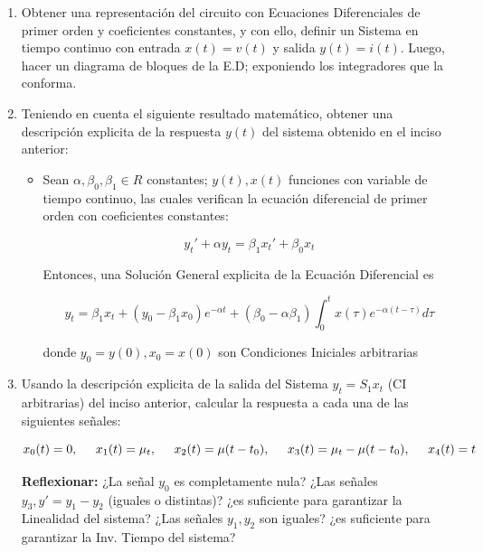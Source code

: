 \documentclass[12pt,a4paper]{report}
\begin{document}
  \begin{enumerate}[label=\alph*)]
    \item Obtener una representación del circuito con Ecuaciones Diferenciales de primer orden
      y coeficientes constantes, y con ello, definir un Sistema en tiempo continuo con entrada
      $x(t) = v(t)$ y salida $y(t) = i(t)$. Luego, hacer un diagrama de bloques de la E.D; exponiendo
      los integradores que la conforma.

    \item Teniendo en cuenta el siguiente resultado matemático, obtener una descripción explicita
      de la respuesta $y(t)$ del sistema obtenido en el inciso anterior:
      \begin{itemize}
        \item Sean $\alpha, \beta_0, \beta_1 \in R$ constantes; $y(t), x(t)$ funciones con variable de tiempo continuo,
          las cuales verifican la ecuación diferencial de primer orden con coeficientes constantes:

          $$y_t'+\alpha y_t = \beta_1 x_t' + \beta_0 x_t$$

          Entonces, una Solución General explicita de la Ecuación Diferencial es

          $$y_t = \beta_1 x_t + (y_0 - \beta_1 x_0) e^{-\alpha t} + (\beta_0 - \alpha \beta_1) \int_{0}^{t} x(\tau) e^{-\alpha(t - \tau)} d\tau$$

          donde $y_0 = y(0), x_0 = x(0)$ son Condiciones Iniciales arbitrarias
        \end{itemize}

    \item Usando la descripción explicita de la salida del Sistema $y_t = S_1{x_t}$ (CI arbitrarias) del
      inciso anterior, calcular la respuesta a cada una de las siguientes señales:

      $$x_0(t) = 0, \hspace{0.5cm}x_1(t) = \mu_t, \hspace{0.5cm}x_2(t) = \mu(t - t_0), \hspace{0.5cm}x_3(t) = \mu_t - \mu(t - t_0), \hspace{0.5cm}x_4(t) = t$$

      \textbf{Reflexionar:} ¿La señal $y_0$ es completamente nula? ¿Las señales $y_3, y' = y_1 - y_2$ (iguales
      o distintas)? ¿es suficiente para garantizar la Linealidad del sistema? ¿Las señales $y_1, y_2$
      son iguales? ¿es suficiente para garantizar la Inv. Tiempo del sistema?
  \end{enumerate}
\end{document}

